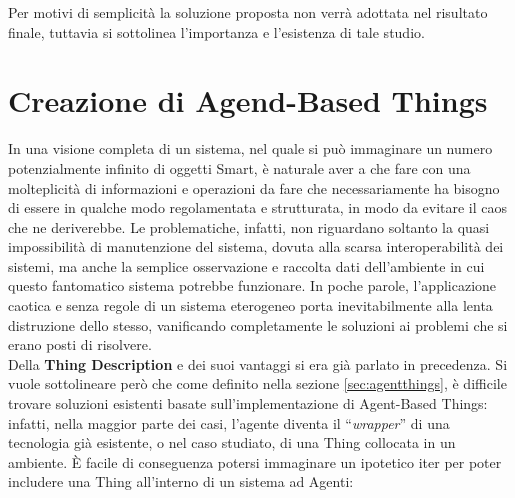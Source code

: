 \documentclass[12pt,a4paper,openright,oneside]{report}
\newcommand{\quotes}[1]{``#1''}
\begin{document}
Per motivi di semplicità la soluzione proposta non verrà adottata nel risultato finale, tuttavia si sottolinea l'importanza e l'esistenza di tale studio.


\section{Creazione di Agend-Based Things}
In una visione completa di un sistema, nel quale si può immaginare un numero potenzialmente infinito di oggetti Smart, è naturale aver a che fare con una molteplicità di informazioni e operazioni da fare che necessariamente ha bisogno di essere in qualche modo regolamentata e strutturata, in modo da evitare il caos che ne deriverebbe. Le problematiche, infatti, non riguardano soltanto la quasi impossibilità di manutenzione del sistema, dovuta alla scarsa interoperabilità dei sistemi, ma anche la semplice osservazione e raccolta dati dell'ambiente in cui questo fantomatico sistema potrebbe funzionare. In poche parole, l'applicazione caotica e senza regole di un sistema eterogeneo porta inevitabilmente alla lenta distruzione dello stesso, vanificando completamente le soluzioni ai problemi che si erano posti di risolvere.\\

Della \textbf{Thing Description} e dei suoi vantaggi si era già parlato in precedenza. Si vuole sottolineare però che come definito nella sezione \ref{sec:agentthings}, è difficile trovare soluzioni esistenti basate sull'implementazione di Agent-Based Things: infatti, nella maggior parte dei casi, l'agente diventa il \quotes{\textit{wrapper}} di una tecnologia già esistente, o nel caso studiato, di una Thing collocata in un ambiente. È facile di conseguenza potersi immaginare un ipotetico iter per poter includere una Thing all'interno di un sistema ad Agenti:
\end{document}

